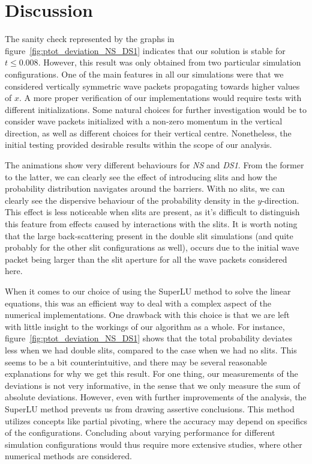 \section{Discussion}\label{sec:discussion}

The sanity check represented by the graphs in figure~\ref{fig:ptot_deviation_NS_DS1} indicates that our solution is stable for $t\leq 0.008$. However, this result was only obtained from two particular simulation configurations. One of the main features in all our simulations were that we considered vertically symmetric wave packets propagating towards higher values of $x$. A more proper verification of our implementations would require tests with different initializations. Some natural choices for further investigation would be to consider wave packets initialized with a non-zero momentum in the vertical direction, as well as different choices for their vertical centre. Nonetheless, the initial testing provided desirable results within the scope of our analysis. 

The animations show very different behaviours for \textit{NS} and \textit{DS1}. From the former to the latter, we can clearly see the effect of introducing slits and how the probability distribution navigates around the barriers. With no slits, we can clearly see the dispersive behaviour of the probability density in the $y$-direction. This effect is less noticeable when slits are present, as it's difficult to distinguish this feature from effects caused by interactions with the slits. It is worth noting that the large back-scattering present in the double slit simulations (and quite probably for the other slit configurations as well), occurs due to the initial wave packet being larger than the slit aperture for all the wave packets considered here.

When it comes to our choice of using the SuperLU method to solve the linear equations, this was an efficient way to deal with a complex aspect of the numerical implementations. One drawback with this choice is that we are left with little insight to the workings of our algorithm as a whole. For instance, figure~\ref{fig:ptot_deviation_NS_DS1} shows that the total probability deviates less when we had double slits, compared to the case when we had no slits. This seems to be a bit counterintuitive, and there may be several reasonable explanations for why we get this result. For one thing, our measurements of the deviations is not very informative, in the sense that we only measure the sum of absolute deviations. However, even with further improvements of the analysis, the SuperLU method prevents us from drawing assertive conclusions. This method utilizes concepts like partial pivoting, where the accuracy may depend on specifics of the configurations. Concluding about varying performance for different simulation configurations would thus require more extensive studies, where other numerical methods are considered.       







